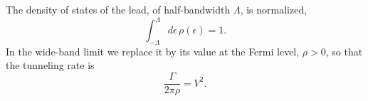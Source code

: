 \documentclass{article}
\begin{document}
The density of states of the lead, of half-bandwidth $\Lambda$, is normalized,
\begin{equation}
\int_{-\Lambda}^{\Lambda} d\epsilon\, \rho(\epsilon) = 1 .
\label{eq:norm}
\end{equation}
In the wide-band limit we replace it by its value at the Fermi level, $\rho > 0$, so that
the tunneling rate is
\begin{equation}
\frac{\Gamma}{2\pi\rho} = V^2 .
\label{eq:gamma}
\end{equation}
\end{document}
